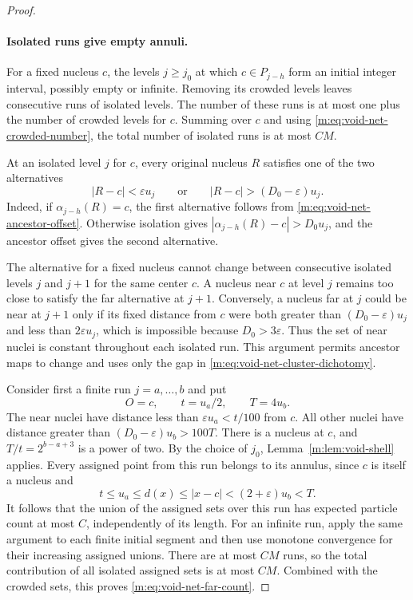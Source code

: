\begin{proof}
\paragraph{Isolated runs give empty annuli.}
For a fixed nucleus $c$, the levels $j\ge j_0$ at which
$c\in P_{j-h}$ form an initial integer interval, possibly empty or
infinite. Removing its crowded levels leaves consecutive runs of
isolated levels. The number of these runs is at most one plus the
number of crowded levels for $c$. Summing over $c$ and using
\eqref{m:eq:void-net-crowded-number}, the total number of isolated runs is at
most $CM$.

At an isolated level $j$ for $c$, every original nucleus $R$ satisfies
one of the two alternatives
\begin{equation}\label{m:eq:void-net-cluster-dichotomy}
 |R-c|<\varepsilon u_j
 \qquad\text{or}\qquad
 |R-c|>(D_0-\varepsilon)u_j.
\end{equation}
Indeed, if $\alpha_{j-h}(R)=c$, the first alternative follows from
\eqref{m:eq:void-net-ancestor-offset}. Otherwise isolation gives
$|\alpha_{j-h}(R)-c|>D_0u_j$, and the ancestor offset gives the
second alternative.

The alternative for a fixed nucleus cannot change between consecutive
isolated levels $j$ and $j+1$ for the same center $c$. A nucleus near
$c$ at level $j$ remains too close to satisfy the far alternative at
$j+1$. Conversely, a nucleus far at $j$ could be near at $j+1$ only if
its fixed distance from $c$ were both greater than
$(D_0-\varepsilon)u_j$ and less than $2\varepsilon u_j$, which is
impossible because $D_0>3\varepsilon$. Thus the set of near nuclei is
constant throughout each isolated run. This argument permits ancestor
maps to change and uses only the gap in
\eqref{m:eq:void-net-cluster-dichotomy}.

Consider first a finite run $j=a,\ldots,b$ and put
\[
 O=c,\qquad t=u_a/2,\qquad T=4u_b.
\]
The near nuclei have distance less than
$\varepsilon u_a<t/100$ from $c$. All other nuclei have distance
greater than $(D_0-\varepsilon)u_b>100T$. There is a nucleus at $c$,
and $T/t=2^{b-a+3}$ is a power of two. By the choice of $j_0$,
Lemma~\ref{m:lem:void-shell} applies. Every assigned point from this run
belongs to its annulus, since $c$ is itself a nucleus and
\[
 t\le u_a\le d(x)\le |x-c|<(2+\varepsilon)u_b<T.
\]
It follows that the union of the assigned sets over this run has
expected particle count at most $C$, independently of its length.
For an infinite run, apply the same argument to each finite initial
segment and then use monotone convergence for their increasing assigned
unions. There are at most $CM$ runs, so the total contribution of all
isolated assigned sets is at most $CM$. Combined with the crowded sets,
this proves \eqref{m:eq:void-net-far-count}.


\end{proof}
